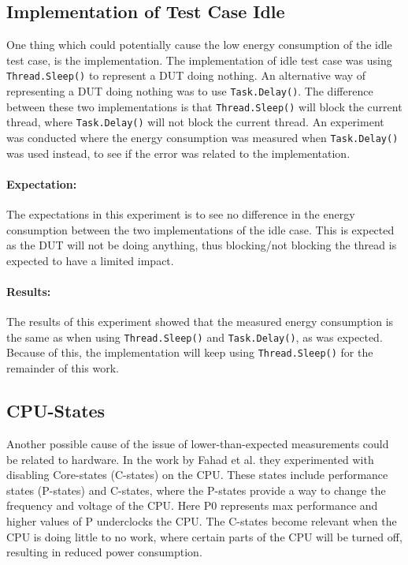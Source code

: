 \subsection{Implementation of Test Case Idle}

One thing which could potentially cause the low energy consumption of the idle test case, is the implementation. The implementation of idle test case was using \texttt{Thread.Sleep()} to represent a DUT doing nothing. An alternative way of representing a DUT doing nothing was to use \texttt{Task.Delay()}. The difference between these two implementations is that \texttt{Thread.Sleep()} will block the current thread, where \texttt{Task.Delay()} will not block the current thread. An experiment was conducted where the energy consumption was measured when \texttt{Task.Delay()} was used instead, to see if the error was related to the implementation.

\paragraph*{Expectation:} The expectations in this experiment is to see no difference in the energy consumption between the two implementations of the idle case. This is expected as the DUT will not be doing anything, thus blocking/not blocking the thread is expected to have a limited impact.

\paragraph*{Results:} The results of this experiment showed that the measured energy consumption is the same as when using \texttt{Thread.Sleep()} and \texttt{Task.Delay()}, as was expected. Because of this, the implementation will keep using \texttt{Thread.Sleep()} for the remainder of this work.

\subsection*{CPU-States}

Another possible cause of the issue of lower-than-expected measurements could be related to hardware. In the work by Fahad et al.\cite[]{fahad2019comparative} they experimented with disabling Core-states (C-states) on the CPU. These states include performance states (P-states) and C-states\cite[]{PCStat}, where the P-states provide a way to change the frequency and voltage of the CPU. Here P0 represents max performance and higher values of P underclocks the CPU. The C-states become relevant when the CPU is doing little to no work, where certain parts of the CPU will be turned off, resulting in reduced power consumption. 

